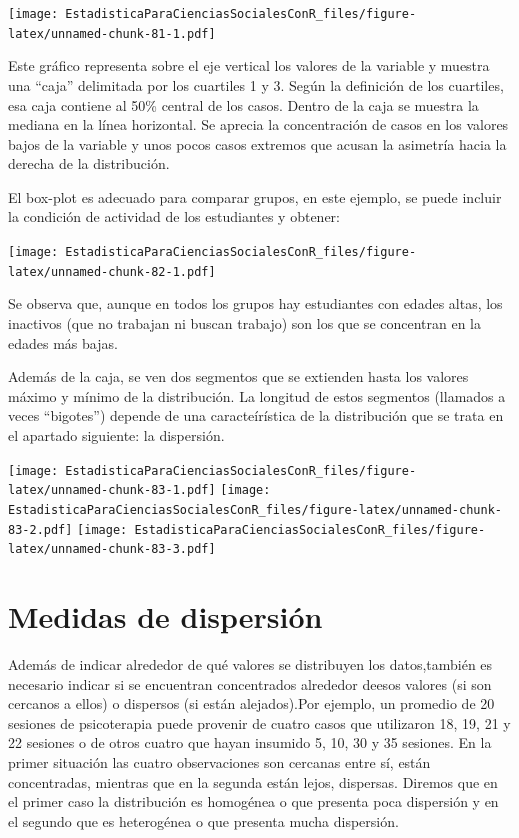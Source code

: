 \documentclass[]{book}
\begin{document}
\texttt{[image: EstadisticaParaCienciasSocialesConR\_files/figure-latex/unnamed-chunk-81-1.pdf]}

Este gráfico representa sobre el eje vertical los valores de la variable y muestra una ``caja'' delimitada por los cuartiles 1 y 3. Según la definición de los cuartiles, esa caja contiene al 50\% central de los casos. Dentro de la caja se muestra la mediana en la línea horizontal. Se aprecia la concentración de casos en los valores bajos de la variable y unos pocos casos extremos que acusan la asimetría hacia la derecha de la distribución.

El box-plot es adecuado para comparar grupos, en este ejemplo, se puede incluir la condición de actividad de los estudiantes y obtener:

\texttt{[image: EstadisticaParaCienciasSocialesConR\_files/figure-latex/unnamed-chunk-82-1.pdf]}

Se observa que, aunque en todos los grupos hay estudiantes con edades altas, los inactivos (que no trabajan ni buscan trabajo) son los que se concentran en la edades más bajas.

Además de la caja, se ven dos segmentos que se extienden hasta los
valores máximo y mínimo de la distribución. La longitud de estos segmentos (llamados a veces ``bigotes'') depende de una caracteírística de la distribución que se trata en el apartado siguiente: la
dispersión.

\texttt{[image: EstadisticaParaCienciasSocialesConR\_files/figure-latex/unnamed-chunk-83-1.pdf]} \texttt{[image: EstadisticaParaCienciasSocialesConR\_files/figure-latex/unnamed-chunk-83-2.pdf]} \texttt{[image: EstadisticaParaCienciasSocialesConR\_files/figure-latex/unnamed-chunk-83-3.pdf]}

\hypertarget{medidas-de-dispersion}{%
\section{Medidas de dispersión}\label{medidas-de-dispersion}}

Además de indicar alrededor de qué valores se distribuyen los datos,también es necesario indicar si se encuentran concentrados alrededor deesos valores (si son cercanos a ellos) o dispersos (si están alejados).Por ejemplo, un promedio de 20 sesiones de psicoterapia puede provenir de cuatro casos que utilizaron 18, 19, 21 y 22 sesiones o de otros cuatro que hayan insumido 5, 10, 30 y 35 sesiones. En la primer situación las cuatro observaciones son cercanas entre sí, están concentradas, mientras que en la segunda están lejos, dispersas. Diremos que en el primer caso la distribución es homogénea o que presenta poca dispersión y en el segundo que es heterogénea o que presenta mucha dispersión.
\end{document}
